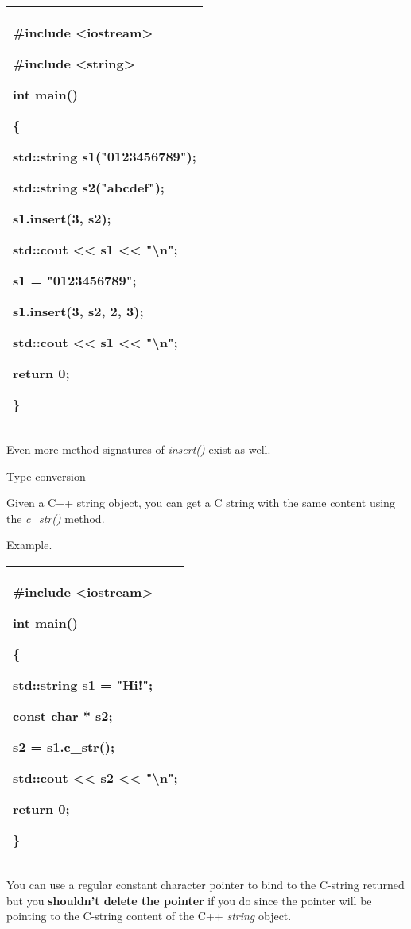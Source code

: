 \documentclass[
]{article}
\begin{document}
\begin{longtable}[]{@{}l@{}}
\toprule
\endhead
\begin{minipage}[t]{0.97\columnwidth}\raggedright
\#include \textless iostream\textgreater{}

\#include \textless string\textgreater{}

int main()

\{

std::string s1("0123456789");

std::string s2("abcdef");

s1.insert(3, s2);

std::cout \textless\textless{} s1 \textless\textless{}
"\textbackslash n";

s1 = "0123456789";

s1.insert(3, s2, 2, 3);

std::cout \textless\textless{} s1 \textless\textless{}
"\textbackslash n";

return 0;

\}\strut
\end{minipage}\tabularnewline
\bottomrule
\end{longtable}

Even more method signatures of \emph{insert()} exist as well.

Type conversion

Given a C++ string object, you can get a C string with the same content
using the \emph{c\_str()} method.

Example.

\begin{longtable}[]{@{}l@{}}
\toprule
\endhead
\begin{minipage}[t]{0.97\columnwidth}\raggedright
\#include \textless iostream\textgreater{}

int main()

\{

std::string s1 = "Hi!";

const char * s2;

s2 = s1.c\_str();

std::cout \textless\textless{} s2 \textless\textless{}
"\textbackslash n";

return 0;

\}\strut
\end{minipage}\tabularnewline
\bottomrule
\end{longtable}

You can use a regular constant character pointer to bind to the C-string
returned but you \textbf{shouldn't delete the pointer} if you do since
the pointer will be pointing to the C-string content of the C++
\emph{string} object.
\end{document}
